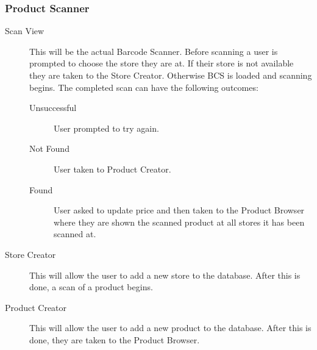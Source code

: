 \subsubsection{Product Scanner}
\begin{description}
\item[Scan View] This will be the actual Barcode Scanner. Before scanning a user is prompted to choose the store they are at. If their store is not
available they are taken to the Store Creator. Otherwise BCS is loaded and scanning begins. The completed scan can have the following outcomes:
\begin{description}
  \item[Unsuccessful] User prompted to try again.
  \item[Not Found] User taken to Product Creator.
  \item[Found] User asked to update price and then taken to the Product Browser
  where they are shown the scanned product at all stores it has been scanned at. 
\end{description}
\item[Store Creator] This will allow the user to add a new store to the database. After this is done, a scan of a product begins.
\item[Product Creator] This will allow the user to add a new product to the database. After this is done, they are taken to the Product Browser.
\end{description} 

